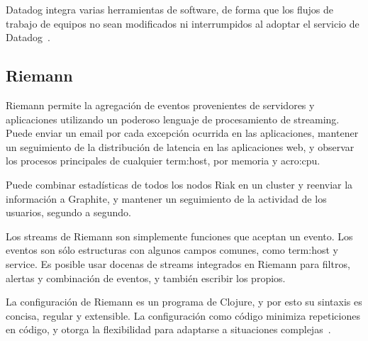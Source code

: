 Datadog integra varias herramientas de software, de forma que los flujos de
trabajo de equipos no sean modificados ni interrumpidos al adoptar el servicio
de Datadog~\cite{datadog}.

\subsection{Riemann}

Riemann permite la agregación de eventos provenientes de servidores y
aplicaciones utilizando un poderoso lenguaje de procesamiento de streaming.
Puede enviar un email por cada excepción ocurrida en las aplicaciones, mantener
un seguimiento de la distribución de latencia en las aplicaciones web, y
observar los procesos principales de cualquier \gls{term:host}, por memoria y
\gls{acro:cpu}.

Puede combinar estadísticas de todos los nodos Riak en un cluster y reenviar la
información a Graphite, y mantener un seguimiento de la actividad de los
usuarios, segundo a segundo.

Los streams de Riemann son simplemente funciones que aceptan un evento. Los
eventos son sólo estructuras con algunos campos comunes, como \gls{term:host} y
service. Es posible usar docenas de streams integrados en Riemann para
filtros, alertas y combinación de eventos, y también escribir los propios.

La configuración de Riemann es un programa de Clojure, y por esto su sintaxis
es concisa, regular y extensible. La configuración como código minimiza
repeticiones en código, y otorga la flexibilidad para adaptarse a situaciones
complejas~\cite{riemann}.

